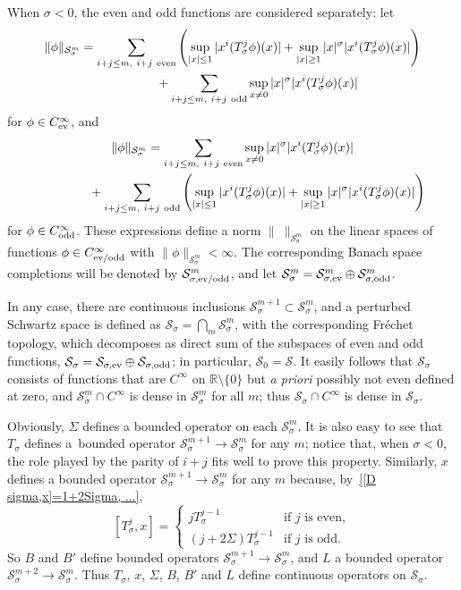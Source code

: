 \documentclass[11pt]{article}
\newcommand{\R}{\mathbb{R}}
\renewcommand{\SS}{\mathcal{S}}
\newcommand{\Cinf}{C^\infty}
\begin{document}
When $\sigma<0$, the even and odd functions are considered separately: let
  \begin{gather}
    \|\phi\|_{\SS_\sigma^m}
    =\sum_{i+j\le m,\ i+j\ \text{even}}\left(\sup_{|x|\le1}|x^i(T_\sigma^j\phi)(x)|
    +\sup_{|x|\ge1}|x|^\sigma |x^i(T_\sigma^j\phi)(x)|\right)\nonumber\\
\hphantom{\|\phi\|_{\SS_\sigma^m}=}{}+\sum_{i+j\le m,\ i+j\ \text{odd}}\sup_{x\ne0}|x|^\sigma |x^i(T_\sigma^j\phi)(x)|\label{SS_sigma,even^m, sigma<0}
   \end{gather}
for $\phi\in\Cinf_{\text{\rm ev}}$, and
  \begin{gather}
    \|\phi\|_{\SS_\sigma^m}
    =\sum_{i+j\le m,\ i+j\ \text{even}}\sup_{x\ne0}|x|^\sigma |x^i(T_\sigma^j\phi)(x)|\nonumber\\
\hphantom{\|\phi\|_{\SS_\sigma^m}=}{}+\sum_{i+j\le m,\ i+j\ \text{odd}}\left(\sup_{|x|\le1}|x^i(T_\sigma^j\phi)(x)|
    +\sup_{|x|\ge1}|x|^\sigma |x^i(T_\sigma^j\phi)(x)|\right)\label{SS_sigma,odd^m, sigma<0}
  \end{gather}
for $\phi\in\Cinf_{\text{\rm odd}}$. These expressions def\/ine a norm
$\|\ \|_{\SS_\sigma^m}$ on the linear spaces of
functions $\phi\in\Cinf_{\text{\rm ev/odd}}$ with
$\|\phi\|_{\SS_\sigma^m}<\infty$. The corresponding
Banach space completions will be denoted by $\SS_{\sigma,\text{\rm
ev/odd}}^m$, and let $\SS_\sigma^m=\SS_{\sigma,\text{\rm ev}}^m\oplus\SS_{\sigma,\text{\rm odd}}^m$.

In any case, there are continuous inclusions
$\SS_\sigma^{m+1}\subset\SS_\sigma^m$, and a perturbed Schwartz space is def\/ined as $\SS_\sigma=\bigcap_m\SS_\sigma^m$, with the corresponding Fr\'echet topology, which decomposes as direct sum of the subspaces of even and odd functions, $\SS_\sigma=\SS_{\sigma,\text{\rm ev}}\oplus\SS_{\sigma,\text{\rm odd}}$; in particular, $\SS_0=\SS$.  It easily follows
that $\SS_\sigma$ consists of functions that are $\Cinf$ on $\R\setminus\{0\}$ but \textit{a priori} possibly not even def\/ined at zero, and $\SS_\sigma^m\cap\Cinf$ is dense in $\SS_\sigma^m$ for all $m$; thus $\SS_\sigma\cap\Cinf$ is dense in $\SS_\sigma$.

Obviously, $\Sigma$ def\/ines a bounded operator on each $\SS_\sigma^m$. It is also easy to see that $T_\sigma$ def\/ines a~bounded operator $\SS_\sigma^{m+1}\to\SS_\sigma^m$ for any $m$; notice that, when $\sigma<0$, the role played by the parity of $i+j$ f\/its well to prove this property. Similarly, $x$ def\/ines a bounded operator $\SS_\sigma^{m+1}\to\SS_\sigma^m$ for any $m$ because, by~\eqref{[D sigma,x]=1+2Sigma, ...},
  \[
    [T_\sigma^j,x]=
      \begin{cases}
        jT_\sigma^{j-1} & \text{if $j$ is even},\\
        (j+2\Sigma)T_\sigma^{j-1} & \text{if $j$ is odd}.
      \end{cases}
  \]
So $B$ and $B'$ def\/ine bounded operators $\SS_\sigma^{m+1}\to\SS_\sigma^m$, and $L$ a bounded operator $\SS_\sigma^{m+2}\to\SS_\sigma^m$. Thus $T_\sigma$, $x$, $\Sigma$, $B$, $B'$ and $L$ def\/ine continuous operators on $\SS_\sigma$.
\end{document}
